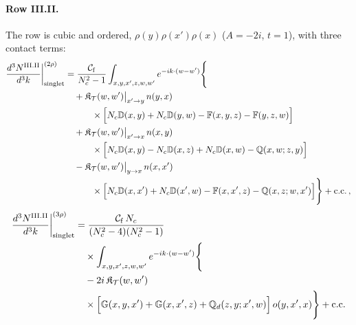 \paragraph{Row III.II.} The row is cubic and ordered, $\rho(y)\rho(x')\rho(x)$ ($A=-2i$, $t=1$), with three contact terms:
\begin{align}\label{eq:sIIIII}
\frac{d^3N^{\rm III.II}}{d^3k}\bigg|^{(2\rho)}_{\rm singlet}&=\frac{\mathcal C_{\rm f}}{N_c^2-1}\int_{x,y,x',z,w,w'}e^{-ik\cdot(w-w')}\Bigg\{\notag\\
&\quad+\mathfrak K_{\mathcal T}(w,w')\big|_{x'\to y}\,n(y,x)\notag\\
&\qquad\quad\times\Big[N_c\mathbb{D}(x,y)+N_c\mathbb{D}(y,w)-\mathbb{F}(x,y,z)-\mathbb{F}(y,z,w)\Big]\notag\\
&\quad+\mathfrak K_{\mathcal T}(w,w')\big|_{x'\to x}\,n(x,y)\notag\\
&\qquad\quad\times\Big[N_c\mathbb{D}(x,y)-N_c\mathbb{D}(x,z)+N_c\mathbb{D}(x,w)-\mathbb{Q}(x,w;z,y)\Big]\notag\\
&\quad-\mathfrak K_{\mathcal T}(w,w')\big|_{y\to x}\,n(x,x')\notag\\
&\qquad\quad\times\Big[N_c\mathbb{D}(x,x')+N_c\mathbb{D}(x',w)-\mathbb{F}(x,x',z)-\mathbb{Q}(x,z;w,x')\Big]\Bigg\}+{\rm c.c.}\,,
\end{align}
\begin{align}\label{eq:oIIIII}
\frac{d^3N^{\rm III.II}}{d^3k}\bigg|^{(3\rho)}_{\rm singlet}&=\frac{\mathcal C_{\rm f}\,N_c}{(N_c^2-4)(N_c^2-1)}\notag\\
&\quad\times\int_{x,y,x',z,w,w'}e^{-ik\cdot(w-w')}\Bigg\{\notag\\
&\quad-2i\,\mathfrak K_{\mathcal T}(w,w')\notag\\
&\quad\times\Big[\mathbb{G}(x,y,x')+\mathbb{G}(x,x',z)+\mathbb{Q}_d(z,y;x',w)\Big]\,o(y,x',x)\Bigg\}+{\rm c.c.}
\end{align}

